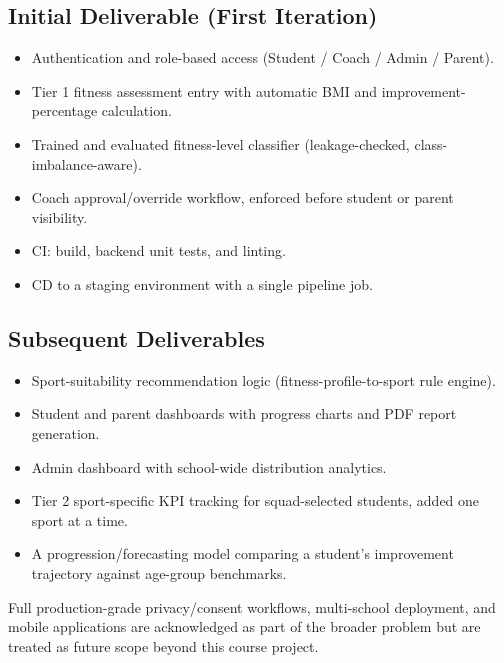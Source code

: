 \documentclass[11pt,a4paper]{article}
\begin{document}
\subsection{Initial Deliverable (First Iteration)}
\begin{itemize}[leftmargin=0.7cm]
    \item Authentication and role-based access (Student / Coach / Admin / Parent).
    \item Tier 1 fitness assessment entry with automatic BMI and improvement-percentage calculation.
    \item Trained and evaluated fitness-level classifier (leakage-checked, class-imbalance-aware).
    \item Coach approval/override workflow, enforced before student or parent visibility.
    \item CI: build, backend unit tests, and linting.
    \item CD to a staging environment with a single pipeline job.
\end{itemize}

\subsection{Subsequent Deliverables}
\begin{itemize}[leftmargin=0.7cm]
    \item Sport-suitability recommendation logic (fitness-profile-to-sport rule engine).
    \item Student and parent dashboards with progress charts and PDF report generation.
    \item Admin dashboard with school-wide distribution analytics.
    \item Tier 2 sport-specific KPI tracking for squad-selected students, added one sport at a time.
    \item A progression/forecasting model comparing a student's improvement trajectory against age-group benchmarks.
\end{itemize}
Full production-grade privacy/consent workflows,
multi-school deployment, and mobile applications are
acknowledged as part of the broader problem but are treated
as future scope beyond this course project.
\end{document}
